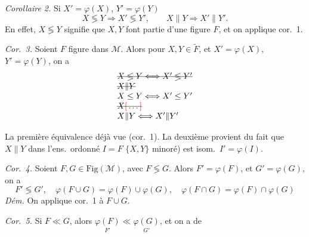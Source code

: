 \documentclass[11pt,a4paper]{article}
\begin{document}
\emph{Corollaire 2.}  Si $X' = \varphi(X)$,
$Y' = \varphi(Y)$
\[
  X \lessgtr Y \Longrightarrow X' \lessgtr Y' , \qquad
  X \| Y \Longrightarrow X' \| Y' .
\]
En effet, $X \lessgtr Y$ signifie que $X, Y$ font partie d'une figure $F$, et on
applique cor.~1.  


\emph{Cor.~3.} Soient $F$ figure dans $\mathcal{M}$. Alors pour
$X, Y \in \widetilde{F}$, et $X' = \varphi(X)$, $Y' = \varphi(Y)$, on a
\[
  \begin{array}{l}
    \text{\struck{$X \lessgtr Y \Longleftrightarrow X' \lessgtr Y'$}} \\
    \text{\struck{$X \| Y$}} \\
    X \leq Y \Longleftrightarrow X' \leq Y' \\
    \text{\struck{$X \ill{}$}} \\
    X \| Y \Longleftrightarrow X' \| Y'
  \end{array}
\]

La première équivalence  déjà vue (cor.~1). La deuxième provient
du fait que $X \| Y$   \ill{} \ill{} dans
l'ens.\ ordonné $I = F$  $\{X, Y\}$ 
minoré)  est isom.\ $I' = \varphi(I)$.

\emph{Cor.~4.} Soient $F, G \in \mathrm{Fig}(\mathcal{M})$, avec $F \lessgtr G$.
Alors  $F' = \varphi(F)$, et $G' = \varphi(G)$, on a
\[
  F' \lessgtr G' , \quad \varphi(F \cup G) = \varphi(F) \cup \varphi(G) ,
  \quad \varphi(F \cap G) = \varphi(F) \cap \varphi(G)
\]
\emph{Dém.} On applique cor.~1 à $F \cup G$.

\emph{Cor.~5.} Si $F \ll G$, alors $\underset{F'}{\varphi(F)} \ll
\underset{G'}{\varphi(G)}$, et on a  de

\end{document}
